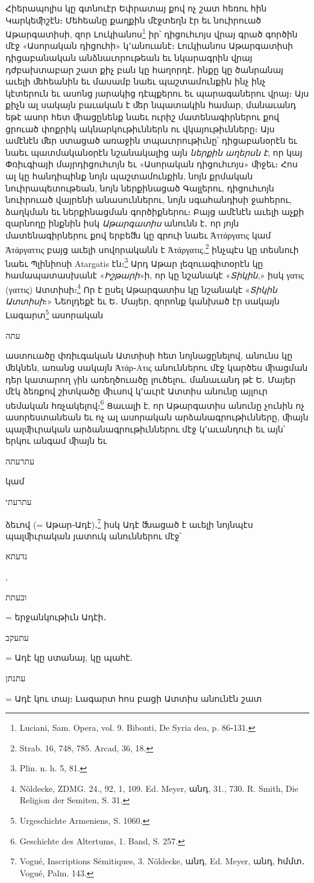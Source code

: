\documentclass{article}
\begin{document}
{Հիերապոլիս կը գտնուէր Եփրատայ քով ոչ շատ հեռու հին Կարկեﬕշէն։ Մեհեանը քաղքին մէջտեղն էր եւ նուիրուած Աթարգատիսի, զոր Լուկիանոս\footnote{Luciani, Sam. Opera, vol. 9. Bibonti, De Syria dea, p. 86֊131.} իր՝ դիցուհւոյս վրայ գրած գործին մէջ «Ասորական դիցուհի» կ՚անուանէ։ Լուկիանոս Աթարգատիսի դիցաբանական անձնաւորութեան եւ նկարագրին վրայ դժբախտաբար շատ քիչ բան կը հաղորդէ․ ինքը կը ծանրանայ աւելի ﬔհեանին եւ մասամբ նաեւ պաշտամունքին ինչ ինչ կէտերուն եւ ասոնց յարակից դէպքերու եւ պարագաներու վրայ։ Այս քիչն ալ սակայն բաւական է ﬔր նպատակին համար, մանաւանդ եթէ ասոր հետ ﬕացընենք նաեւ ուրիշ մատենագիրներու քով ցրուած փոքրիկ ակնարկութիւններն ու վկայութիւնները։ Այս ամէնէն ﬔր ստացած առաջին տպաւորութիւնը՝ դիցաբանօրէն եւ նաեւ պատմականօրէն նշանակալից այն \emph{ներքին աղերսն է}, որ կայ Փռիւգիայի մայրդիցուհւոյն եւ «Ասորական դիցուհւոյս» ﬕջեւ։ Հոս ալ կը հանդիպինք նոյն պաշտամունքին, նոյն քրմական նուիրապետութեան, նոյն ներքինացած Գալլերու, դիցուհւոյն նուիրուած վայրենի անասուններու, նոյն սգահանդիսի ջահերու, ձաղկման եւ ներքինացման գործիքներու։ Բայց ամէնէն աւելի աչքի զարնողը ինքնին իսկ \emph{Աթարգատիս} անունն է․ որ յոյն մատենագիրներու քով երբեﬓ կը գրուի նաեւ Ἀττάργατις կամ Ἀτάργαττις բայց աւելի սովորականն է Ἀτάργατις,\footnote{Strab. 16, 748, 785. Arcad, 36, 18.} ինչպէս կը տեսնուի նաեւ Պլինիոսի Atargatis էն։\footnote{Plin. n. h. 5, 81.} Արդ Աթար լեզուագիտօրէն կը համապատասխանէ «\emph{Իշթարի}»ի, որ կը նշանակէ «\emph{Տիկին},» իսկ γατις (γαττις) Ատտիսի։\footnote{Nöldecke, ZDMG. 24., 92, 1, 109. Ed. Meyer, անդ, 31., 730. R. Smith, Die Religion der Semiten, S. 31.} Որ է ըսել Աթարգատիս կը նշանակէ «\emph{Տիկին Ատտիսի}։» Նեոլդեքէ եւ Ե․ Մայեր, զորոնք կանխած էր սակայն Լագարտ\footnote{Urgeschichte Armeniens, S. 1060.} ասորական \begin{hebrewfont}עתה\end{hebrewfont} աստուածը փռիւգական Ատտիսի հետ նոյնացընելով, անունս կը ﬔկնեն, առանց սակայն Ἀτάρ֊Ατις անուններու մէջ կարծես ﬕացման դեր կատարող γին առեղծուածը լուծելու․ մանաւանդ թէ Ե․ Մայեր մէկ ձեռքով շիտկածը ﬕւսով կ՚աւրէ Ատտիս անունը այլուր սեմական հռչակելով։\footnote{Geschichte des Altertums, 1. Band, S. 257.} Ցաւալի է, որ Աթարգատիս անունը չունին ոչ ասորեստանեան եւ ոչ ալ ասորական արձանագրութիւնները, ﬕայն պալﬕւրական արձանագրութիւններու մէջ կ՚աւանդուի եւ այն՝ երկու անգամ ﬕայն եւ \begin{hebrewfont}עתרעתה\end{hebrewfont} կամ \begin{hebrewfont}עתרעתי\end{hebrewfont} ձեւով (= Աթար֊Ադէ)․\footnote{Vogué, Inscriptions Sémitiques, 3. Nöldecke, անդ, Ed. Meyer, անդ, հմմտ․ Vogué, Palm. 143.} իսկ Ադէ ﬓացած է աւելի նոյնպէս պալﬕւրական յատուկ անուններու մէջ՝ \begin{hebrewfont}נדעתא\end{hebrewfont}, \begin{hebrewfont}ובעתת\end{hebrewfont} = երջանկութիւն Ադէի․ \begin{hebrewfont}עתעקב\end{hebrewfont} = Ադէ կը ստանայ, կը պահէ․ \begin{hebrewfont}עתנתן\end{hebrewfont} = Ադէ կու տայ։ Լագարտ հոս բացի Ատտիս անունէն շատ }
\end{document}
